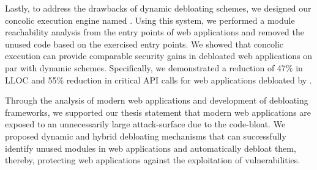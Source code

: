 Lastly, to address the drawbacks of dynamic debloating schemes, we designed our concolic execution engine named \animatedead{}. 
Using this system, we performed a module reachability analysis from the entry points of web applications and removed the unused code based on the exercised entry points. 
We showed that concolic execution can provide comparable security gains in debloated web applications on par with dynamic schemes. 
Specifically, we demonstrated a reduction of 47\% in LLOC and 55\% reduction in critical API calls for web applications debloated by \animatedead{}. 

Through the analysis of modern web applications and development of debloating frameworks, we supported our thesis statement that modern web applications are exposed to an unnecessarily large attack-surface due to the code-bloat. 
We proposed dynamic and hybrid debloating mechanisms that can successfully identify unused modules in web applications and automatically debloat them, thereby, protecting web applications against the exploitation of vulnerabilities. 